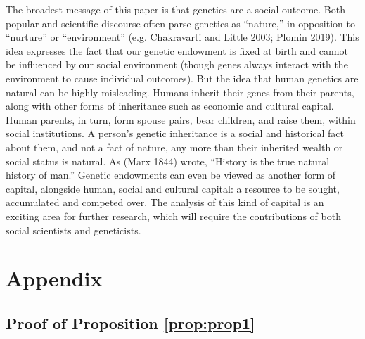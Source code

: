 \documentclass[
]{article}
\begin{document}
The broadest message of this paper is that genetics are a social
outcome. Both popular and scientific discourse often parse genetics as
``nature,'' in opposition to ``nurture'' or ``environment'' (e.g. Chakravarti and Little 2003; Plomin 2019). This idea expresses the
fact that our genetic endowment is fixed at birth and cannot be
influenced by our social environment (though genes always interact with the
environment to cause individual outcomes). But the idea that human
genetics are natural can be highly misleading. Humans inherit their
genes from their parents, along with other forms of inheritance such as
economic and cultural capital. Human parents, in turn, form spouse
pairs, bear children, and raise them, within social institutions. A
person's genetic inheritance is a social and historical fact about them,
and not a fact of nature, any more than their inherited wealth or social
status is natural. As (Marx 1844) wrote, ``History is the true
natural history of man.'' Genetic endowments can even be viewed as
another form of capital, alongside human, social and cultural capital: a
resource to be sought, accumulated and competed over. The analysis of
this kind of capital is an exciting area for further research, which
will require the contributions of both social scientists and
geneticists.

\FloatBarrier

\newpage

\hypertarget{appendix}{%
\section{Appendix}\label{appendix}}

\hypertarget{proof-of-proposition-refpropprop1}{%
\subsection{Proof of Proposition \ref{prop:prop1}}\label{proof-of-proposition-refpropprop1}}
\end{document}
